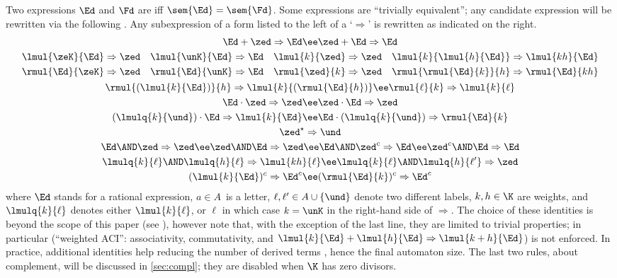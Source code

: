 \documentclass[a4paper,USenglish]{lipics}
\begin{document}
Two expressions $\Ed$ and $\Fd$ are  iff
$\sem{\Ed} = \sem{\Fd}$.  Some expressions are ``trivially equivalent''; any
candidate expression will be rewritten via the following .  Any subexpression of a form listed to the left of a
`$\Rightarrow$' is rewritten as indicated on the right.
\begin{gather*}
\Ed+\zed  \Rightarrow \Ed
  \ee
  \zed+\Ed  \Rightarrow \Ed
  \\\begin{aligned}[t]
    \lmul{\zeK}{\Ed} & \Rightarrow \zed &
    \lmul{\unK}{\Ed} & \Rightarrow \Ed  &
    \lmul{k}{\zed}   & \Rightarrow \zed &
    \lmul{k}{\lmul{h}{\Ed}} &\Rightarrow \lmul{kh}{\Ed}
    \\
    \rmul{\Ed}{\zeK} & \Rightarrow \zed &
    \rmul{\Ed}{\unK} & \Rightarrow  \Ed &
    \rmul{\zed}{k}   & \Rightarrow \zed &
    \rmul{\rmul{\Ed}{k}}{h}  &\Rightarrow \rmul{\Ed}{kh}
  \end{aligned}\\
  \rmul{(\lmul{k}{\Ed})}{h} \Rightarrow \lmul{k}{(\rmul{\Ed}{h})} \ee
  \rmul{\ell}{k} \Rightarrow \lmul{k}{\ell}
  \\ \Ed \cdot \zed  \Rightarrow \zed \ee
  \zed \cdot \Ed  \Rightarrow \zed
  \\
  (\lmulq{k}{\und}) \cdot \Ed   \Rightarrow  \lmul{k}{\Ed}
  \ee
  \Ed \cdot (\lmulq{k}{\und})   \Rightarrow  \rmul{\Ed}{k}
  \\ \zed^\star \Rightarrow \und
  \\
  \Ed \AND \zed  \Rightarrow \zed  \ee \zed \AND \Ed  \Rightarrow \zed
  \ee
  \Ed \AND \zed^c  \Rightarrow \Ed \ee \zed^c \AND \Ed  \Rightarrow \Ed
  \\
  \lmulq{k}{\ell} \AND \lmulq{h}{\ell}  \Rightarrow  \lmul{kh}{\ell}
  \ee
  \lmulq{k}{\ell} \AND \lmulq{h}{\ell'}  \Rightarrow  \zed
  \\
  (\lmul{k}{\Ed})^c \Rightarrow \Ed^c \ee
  (\rmul{\Ed}{k})^c \Rightarrow \Ed^c
\end{gather*}
where $\Ed$ stands for a rational expression, $a \in A$~is a letter,
$\ell, \ell' \in A \cup \{\und\}$ denote two different labels, $k, h\in \K$
are weights, and $\lmulq{k}{\ell}$ denotes either $\lmul{k}{\ell}$, or
$\ell$ in which case $k = \unK$ in the right-hand side of $\Rightarrow$.
The choice of these identities is beyond the scope of this paper (see
\cite{sakarovitch.09.eat}), however note that, with the exception of the
last line, they are limited to trivial properties; in particular
 (``weighted ACI'': associativity, commutativity, and
$\lmul{k}{\Ed} + \lmul{h}{\Ed} \Rightarrow \lmul{k+h}{\Ed}$) is not
enforced.  In practice, additional identities help reducing the number of
derived terms \citep{owens.2009.jfp}, hence the final automaton size.  The
last two rules, about complement, will be discussed in \cref{sec:compl};
they are disabled when $\K$ has zero divisors.
\end{document}
